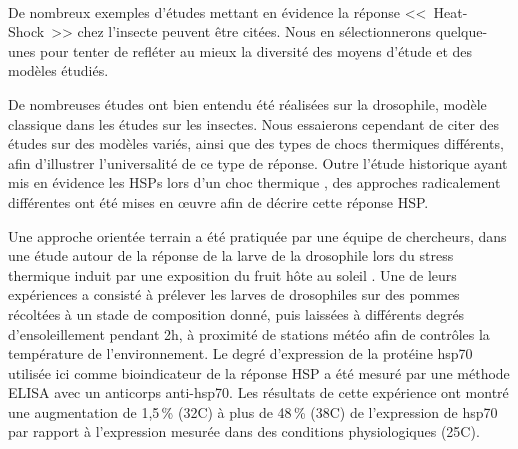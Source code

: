		\paragraph*{}
		De nombreux exemples d'études mettant en évidence la réponse <<~Heat-Shock~>> chez l'insecte peuvent être citées.
		Nous en sélectionnerons quelque-unes pour tenter de refléter au mieux la diversité des moyens d'étude et des modèles étudiés.



		De nombreuses études ont bien entendu été réalisées sur la drosophile, modèle classique dans les études sur les insectes.
		Nous essaierons cependant de citer des études sur des modèles variés, ainsi que des types de chocs thermiques différents, afin d'illustrer l'universalité de ce type de réponse.
		Outre l'étude historique ayant mis en évidence les HSPs lors d'un choc thermique \cite{tissieres1974}, 
		des approches radicalement différentes ont été mises en \oe{}uvre afin de décrire cette réponse HSP.

		Une approche orientée terrain a été pratiquée par une équipe de chercheurs, dans une étude autour de la réponse de la larve de la drosophile lors du stress thermique induit par une exposition du fruit hôte au soleil \cite{feder1997}.
		Une de leurs expériences a consisté à prélever les larves de drosophiles sur des pommes récoltées à un stade de composition donné, puis laissées à différents degrés d'ensoleillement pendant 2h, à proximité de stations météo afin de contrôles la température de l'environnement.
		Le degré d'expression de la protéine hsp70 utilisée ici comme bioindicateur de la réponse HSP a été mesuré par une méthode ELISA avec un anticorps anti-hsp70.
		Les résultats de cette expérience ont montré une augmentation de 1,5\,\% (32\textdegree{}C) à plus de 48\,\% (38\textdegree{}C) de l'expression de hsp70 par rapport à l'expression mesurée dans des conditions physiologiques (25\textdegree{}C). %

